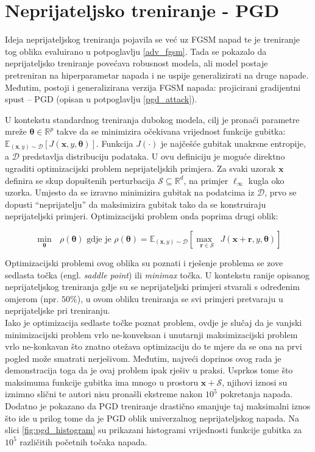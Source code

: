 \documentclass[utf8, diplomski]{fer}
\begin{document}
\section{Neprijateljsko treniranje - PGD}\label{pgd_adv}
Ideja neprijateljskog treniranja pojavila se već uz FGSM napad\citep{Goodfellow2015ExplainingAH} te je treniranje tog oblika evaluirano u potpoglavlju \ref{adv_fgsm}. Tada se pokazalo da neprijateljsko treniranje povećava robusnost modela, ali model postaje pretreniran na hiperparametar napada i ne uspije generalizirati na druge napade. Međutim, postoji i generalizirana verzija FGSM napada: projicirani gradijentni spust -- PGD (opisan u potpoglavlju \ref{pgd_attack}). \par 
U kontekstu standardnog treniranja dubokog modela, cilj je pronaći parametre mreže $\boldsymbol{\theta} \in \mathbb{R}^{p}$ takve da se minimizira očekivana vrijednost funkcije gubitka: $\mathbb{E}_{(\boldsymbol{x}, y) \sim \mathcal{D}} [J(\boldsymbol{x}, y, \boldsymbol{\theta})]$. Funkcija $J(\cdot)$ je najčešće gubitak unakrsne entropije, a $\mathcal{D}$ predstavlja distribuciju podataka. U ovu definiciju je moguće direktno ugraditi optimizacijski problem neprijateljskih primjera. Za svaki uzorak $\boldsymbol{x}$ definira se skup dopuštenih perturbacija $\mathcal{S} \subseteq \mathbb{R}^{d}$, na primjer $\ell_{\infty}$ kugla oko uzorka. Umjesto da se izravno minimizira gubitak na podatcima iz $\mathcal{D}$, prvo se dopusti ``neprijatelju'' da maksimizira gubitak tako da se konstruiraju neprijateljski primjeri. Optimizacijski problem onda poprima drugi oblik:

\begin{equation}
\underset{\boldsymbol{\theta}}{\min}\text{ }\rho(\boldsymbol{\theta}) \text{ gdje je } \rho  (\boldsymbol{\theta}) = \mathbb{E}_{(\boldsymbol{x}, y) \sim \mathcal{D}}[\underset{\boldsymbol{r} \in \mathcal{S}}{\max\text{ }} J(\boldsymbol{x} + \boldsymbol{r}, y, \boldsymbol{\theta})]
\end{equation}

Optimizacijski problemi ovog oblika su poznati i rješenje problema se zove sedlasta točka (engl. \textit{saddle point}) ili \textit{minimax} točka. U kontekstu ranije opisanog neprijateljskog treniranja gdje su se neprijateljski primjeri stvarali s određenim omjerom (npr. $50\%$), u ovom obliku treniranja se svi primjeri pretvaraju u neprijateljske pri treniranju. \\
Iako je optimizacija sedlaste točke poznat problem, ovdje je slučaj da je vanjski minimizacijski problem vrlo ne-konveksan i unutarnji maksimizacijski problem vrlo ne-konkavan što znatno otežava optimizaciju do te mjere da se ona na prvi pogled može smatrati nerješivom. Međutim, najveći doprinos ovog rada je demonstracija toga da je ovaj problem ipak rješiv u praksi. Usprkos tome što maksimuma funkcije gubitka ima mnogo u prostoru $\boldsymbol{x} + \mathcal{S}$, njihovi iznosi su iznimno slični te autori nisu pronašli ekstreme nakon $10^{5}$ pokretanja napada. Dodatno je pokazano da PGD treniranje drastično smanjuje taj maksimalni iznos što ide u prilog tome da je PGD oblik univerzalnog neprijateljskog napada. Na slici \ref{fig:pgd_histogram} su prikazani histogrami vrijednosti funkcije gubitka za $10^{5}$ različitih početnih točaka napada. 
\end{document}
